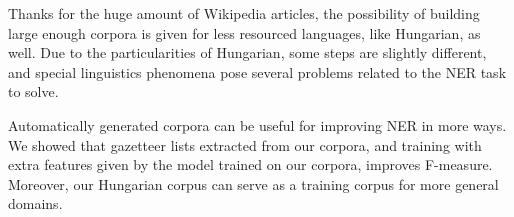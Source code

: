 \documentclass[11pt]{article}
\begin{document}
Thanks for the huge amount of Wikipedia articles, the possibility of building large enough corpora is given for less resourced languages, like Hungarian, as well. Due to the particularities of Hungarian, some steps are slightly different, and special linguistics phenomena pose several problems related to the NER task to solve. 

Automatically generated corpora can be useful for improving NER in more ways. We showed that gazetteer lists extracted from our corpora, and training with extra features given by the model trained on our corpora, improves F-measure. Moreover, our Hungarian corpus can serve as a training corpus for more general domains. 




\end{document}
